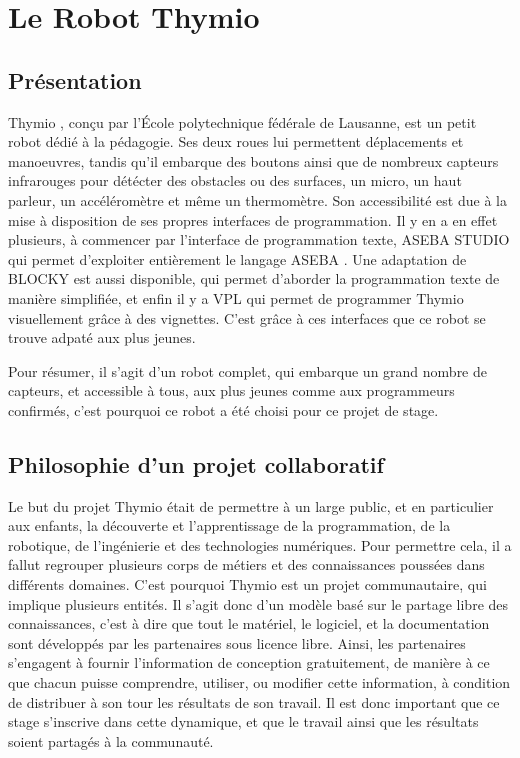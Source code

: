 \documentclass[a4paper, 12pt]{report}
\begin{document}
\chapter{Le Robot Thymio}
\section{Présentation \cite{PresThymio} }
\label{thymio}

Thymio \pageref{thymio}, conçu par l’École polytechnique fédérale de Lausanne, est un petit robot dédié à la pédagogie. Ses deux roues lui permettent déplacements et manoeuvres, tandis qu'il embarque des boutons ainsi que de nombreux capteurs infrarouges pour détécter des obstacles ou des surfaces, un micro, un haut parleur, un accéléromètre et même un thermomètre. Son accessibilité est due à la mise à disposition de ses propres interfaces de programmation. Il y en a en effet plusieurs, à commencer par l'interface de programmation texte, ASEBA STUDIO qui permet d'exploiter entièrement le langage ASEBA \pageref{aseba}. Une adaptation de BLOCKY est aussi disponible, qui permet d'aborder la programmation texte de manière simplifiée, et enfin il y a VPL qui permet de programmer Thymio visuellement grâce à des vignettes. C'est grâce à ces interfaces que ce robot se trouve adpaté aux plus jeunes.

Pour résumer, il s'agit d'un robot complet, qui embarque un grand nombre de capteurs, et accessible à tous, aux plus jeunes comme aux programmeurs confirmés, c'est pourquoi ce robot a été choisi pour ce projet de stage.

\section{Philosophie d'un projet collaboratif \cite{PhiloThymio} }
Le but du projet Thymio \pageref{thymio} était de permettre à un large public, et en particulier aux enfants, la découverte et l'apprentissage de la programmation, de la robotique, de l'ingénierie et des technologies numériques. Pour permettre cela, il a fallut regrouper plusieurs corps de métiers et des connaissances poussées dans différents domaines. C'est pourquoi Thymio \pageref{thymio} est un projet communautaire, qui implique plusieurs entités. Il s'agit donc d'un modèle basé sur le partage libre des connaissances, c'est à dire que tout le matériel, le logiciel, et la documentation sont développés par les partenaires sous licence libre. Ainsi, les partenaires s'engagent à fournir l'information de conception gratuitement, de manière à ce que chacun puisse comprendre, utiliser, ou modifier cette information, à condition de distribuer à son tour les résultats de son travail. Il est donc important que ce stage s'inscrive dans cette dynamique, et que le travail ainsi que les résultats soient partagés à la communauté.
\end{document}
